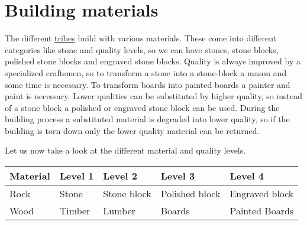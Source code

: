 \section{Building materials}\label{ch:Goods:Materials}

The different \hyperref[ch:Tribes]{tribes} build with various materials. These
come into different categories like stone and quality levels, so we can have
stones, stone blocks, polished stone blocks and engraved stone blocks. Quality
is always improved by a specialized craftsmen, so to transform a stone into a
stone-block a mason and some time is necessary. To transform boards into
painted boards a painter and paint is necessary. Lower qualities can be
substituted by higher quality, so instead of a stone block a polished or
engraved stone block can be used. During the building process a substituted
material is degraded into lower quality, so if the building is torn down only
the lower quality material can be returned.

Let us now take a look at the different material and quality levels.
\begin{longtable}{lllll}
	\toprule
	Material & Level 1      & Level 2     & Level 3        & Level 4        \\
	\midrule
	Rock     & \Gls{Stone}  & Stone block & Polished block & Engraved block \\
	Wood     & \Gls{Timber} & Lumber      & Boards         & Painted Boards \\
	\bottomrule
\end{longtable}
